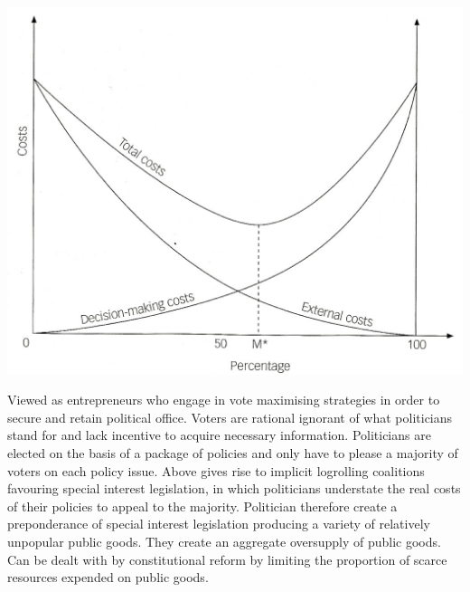 \documentclass[12pt]{examnotes}
\begin{document}
\includegraphics[scale=0.3]{./imgs/61.jpg}

\ra Viewed as entrepreneurs who engage in vote maximising strategies in order to secure and retain political office.
\ra Voters are rational ignorant of what politicians stand for and lack incentive to acquire necessary information.
\ra Politicians are elected on the basis of a package of policies and only have to please a majority of voters on each policy issue.
\ra Above gives rise to implicit logrolling coalitions favouring special interest legislation, in which politicians understate the real costs of their policies to appeal to the majority.
\ra Politician therefore create a preponderance of special interest legislation producing a variety of relatively unpopular public goods.
\ra They create an aggregate oversupply of public goods.
\ra Can be dealt with by constitutional reform by limiting the proportion of scarce resources expended on public goods.
\end{document}
